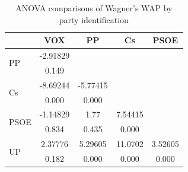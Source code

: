 \documentclass[a4paper, svgnames]{article}
\begin{document}
\begin{table}[H]
	\centering
	\caption{ANOVA comparisons of Wagner's WAP by party identification}
	\label{tab:anova-party-wap}
	\begin{tabular}{@{}lcccc@{}}
		\toprule
		                      & VOX      & PP       & Cs      & PSOE    \\ \midrule
		\multirow{2}{*}{PP}   & -2.91829 &          &         &         \\
		                      & 0.149    &          &         &         \\
		\multirow{2}{*}{Cs}   & -8.69244 & -5.77415 &         &         \\
		                      & 0.000    & 0.000    &         &         \\
		\multirow{2}{*}{PSOE} & -1.14829 & 1.77     & 7.54415 &         \\
		                      & 0.834    & 0.435    & 0.000   &         \\
		\multirow{2}{*}{UP}   & 2.37776  & 5.29605  & 11.0702 & 3.52605 \\
		                      & 0.182    & 0.000    & 0.000   & 0.000   \\ \bottomrule
	\end{tabular}
\end{table}
\end{document}
